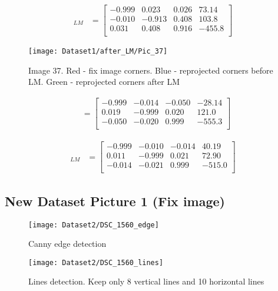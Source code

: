 \documentclass[11pt]{article}
\begin{document}
\begin{align*}
[\mathbf{R}|t]_{LM} &= \begin{bmatrix} 
-0.999 & 0.023 &  0.026 & 73.14 \\
-0.010 & -0.913 & 0.408 & 103.8 \\
0.031 & 0.408 & 0.916 & -455.8\\
\end{bmatrix}
\end{align*}

\begin{figure}[H]
\centering
\texttt{[image: Dataset1/after\_LM/Pic\_37]}
\caption{Image 37. Red - fix image corners. Blue - reprojected corners before LM. Green - reprojected corners after LM}
\label{}
\end{figure}

\begin{align*}
[\mathbf{R}|t] &= \begin{bmatrix} 
-0.999 & -0.014 & -0.050 & -28.14 \\
0.019 & -0.999 & 0.020 & 121.0 \\
-0.050 & -0.020 & 0.999 & -555.3\\
\end{bmatrix}
\end{align*}

\begin{align*}
[\mathbf{R}|t]_{LM} &= \begin{bmatrix} 
-0.999 & -0.010 & -0.014 & 40.19 \\
0.011 & -0.999 & 0.021 & 72.90 \\
-0.014 & -0.021 & 0.999 & -515.0\\
\end{bmatrix}
\end{align*}



\subsection*{New Dataset Picture 1 (Fix image)}

\begin{figure}[H]
\centering
\texttt{[image: Dataset2/DSC\_1560\_edge]}
\caption{Canny edge detection}
\label{}
\end{figure}

\begin{figure}[H]
\centering
\texttt{[image: Dataset2/DSC\_1560\_lines]}
\caption{Lines detection. Keep only 8 vertical lines and 10 horizontal lines}
\label{}
\end{figure}
\end{document}
